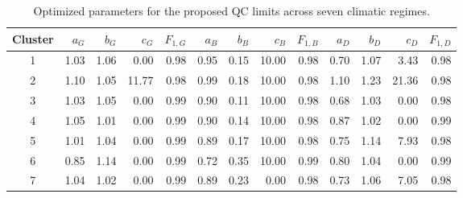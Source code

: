 \begin{table}[htbp]
\centering
\caption{Optimized parameters for the proposed QC limits across seven climatic regimes.} 
\label{tab:fitted_parameters}
\begin{tabular}{crrrrrrrrrrrr}
  \toprule
Cluster & $a_G$ & $b_G$ & $c_G$ & $F_{1,G}$ & $a_B$ & $b_B$ & $c_B$ & $F_{1,B}$ & $a_D$ & $b_D$ & $c_D$ & $F_{1,D}$ \\ 
  \midrule
1 & 1.03 & 1.06 & 0.00 & 0.98 & 0.95 & 0.15 & 10.00 & 0.98 & 0.70 & 1.07 & 3.43 & 0.98 \\ 
  2 & 1.10 & 1.05 & 11.77 & 0.98 & 0.99 & 0.18 & 10.00 & 0.98 & 1.10 & 1.23 & 21.36 & 0.98 \\ 
  3 & 1.03 & 1.05 & 0.00 & 0.99 & 0.90 & 0.11 & 10.00 & 0.98 & 0.68 & 1.03 & 0.00 & 0.98 \\ 
  4 & 1.05 & 1.01 & 0.00 & 0.99 & 0.90 & 0.14 & 10.00 & 0.98 & 0.87 & 1.02 & 0.00 & 0.99 \\ 
  5 & 1.01 & 1.04 & 0.00 & 0.99 & 0.89 & 0.17 & 10.00 & 0.98 & 0.75 & 1.14 & 7.93 & 0.98 \\ 
  6 & 0.85 & 1.14 & 0.00 & 0.99 & 0.72 & 0.35 & 10.00 & 0.99 & 0.80 & 1.04 & 0.00 & 0.99 \\ 
  7 & 1.04 & 1.02 & 0.00 & 0.99 & 0.89 & 0.23 & 0.00 & 0.98 & 0.73 & 1.06 & 7.05 & 0.98 \\ 
   \bottomrule
\end{tabular}
\end{table}
